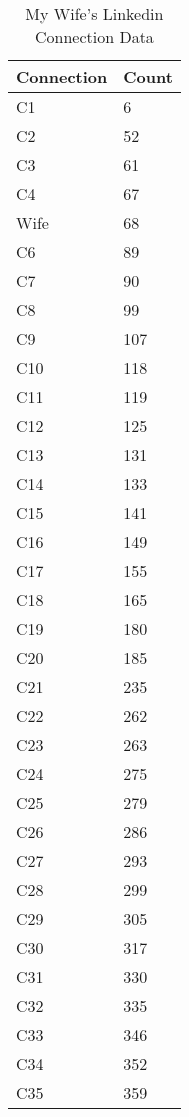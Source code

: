 \begin{table}[!htbp]
	\caption{My Wife's Linkedin Connection Data} \label{tab:table3}
	\small
	\begin{center}
	\vspace{-5mm}
	\begin{minipage}{0.30\textwidth}
		\begin{tabular}{|l | l|}
			\hline
			\multicolumn{1}{|c|}{Connection} & \multicolumn{1}{c|}{Count}\\
			\hline
			C1 & 6\\
			C2 & 52\\
			C3 & 61\\
			C4 & 67\\
			Wife & 68\\
			C6 & 89\\
			C7 & 90\\
			C8 & 99\\
			C9 & 107\\
			C10 & 118\\
			C11 & 119\\
			C12 & 125\\
			C13 & 131\\
			C14 & 133\\
			C15 & 141\\
			C16 & 149\\
			C17 & 155\\
			C18 & 165\\
			C19 & 180\\
			C20 & 185\\
			C21 & 235\\
			C22 & 262\\
			C23 & 263\\
			C24 & 275\\
			C25 & 279\\
			C26 & 286\\
			C27 & 293\\
			C28 & 299\\
			C29 & 305\\
			C30 & 317\\
			C31 & 330\\
			C32 & 335\\
			C33 & 346\\
			C34 & 352\\
			C35 & 359\\

\end{tabular}
\end{minipage}
\end{center}
\end{table}
